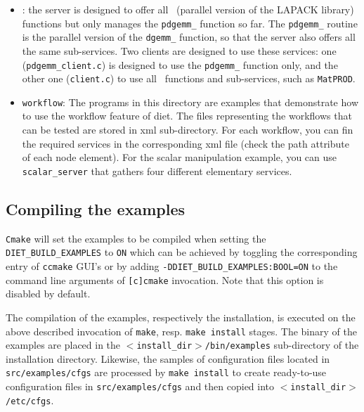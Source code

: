 \begin{itemize}
\item{\texttt{\scalapack}}: the server is designed to offer all
  \scalapack\  (parallel version of the LAPACK library) functions but
  only manages the \texttt{pdgemm\_} function so far. The
  \texttt{pdgemm\_} routine is the parallel version of the
  \texttt{dgemm\_} function, so that the server also offers all the
  same sub-services. Two clients are designed to use these services:
  one (\texttt{pdgemm\_client.c}) is designed to use the
  \texttt{pdgemm\_} function only, and the other one
  (\texttt{client.c}) to use all \scalapack\ functions and
  sub-services, such as \texttt{MatPROD}.

\item{\texttt{workflow}}: The programs in this directory are examples that
  demonstrate how to use the workflow feature of diet.
  The files representing the workflows that can be tested are stored in
  xml sub-directory.
  For each workflow, you can fin the required services in the corresponding
  xml file (check the path attribute of each node element).
  For the scalar manipulation example, you can use \texttt{scalar\_server}
  that gathers four different elementary services.
\end{itemize}

\subsection{Compiling the examples}
\label{subsection:compiling-examples}

\verb+Cmake+ will set the examples to be compiled when setting the 
\verb+DIET_BUILD_EXAMPLES+ to \verb+ON+ which can be achieved by
toggling the corresponding entry of \verb+ccmake+ GUI's or by adding
\verb+-DDIET_BUILD_EXAMPLES:BOOL=ON+ to the command line
arguments of \verb+[c]cmake+ invocation.
Note that this option is disabled by default.

The compilation of the examples, respectively the installation, is
executed on the above described invocation of \verb+make+, resp. 
\verb+make install+ stages.
The binary of the examples are placed in the 
\texttt{$<$install\_dir$>$/bin/examples} sub-directory of the installation
directory.
Likewise, the samples of configuration files located in
\texttt{src/examples/cfgs} are processed by \texttt{make install} to
create ready-to-use configuration files in \texttt{src/examples/cfgs} and
then copied into \texttt{$<$install\_dir$>$/etc/cfgs}.
